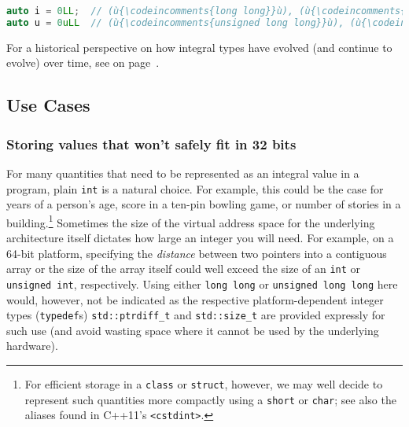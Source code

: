 \begin{lstlisting}[language=C++]
auto i = 0LL;  // (ù{\codeincomments{long long}}ù), (ù{\codeincomments{sizeof(i) * CHAR\_BIT >= 64}}ù)
auto u = 0uLL  // (ù{\codeincomments{unsigned long long}}ù), (ù{\codeincomments{sizeof(u) * CHAR\_BIT >= 64}}ù)
\end{lstlisting}

\noindent For a historical perspective on how integral types have evolved (and
continue to evolve) over time, see {\it{}} on page~\pageref{historical-perspective-on-the-evolution-of-use-of-fundamental-integral-types}.

\subsection[Use Cases]{Use Cases}\label{use-cases}

\subsubsection[Storing values that won't safely fit in 32 bits]{Storing values that won't safely fit in 32 bits}\label{when-your-pedestrian-four-byte-int-might-not-cut-it}\label{Storing-values-that-won't-safely-fit-in-32-bits}

For many quantities that need to be represented as an integral value in a program, plain \lstinline!int! is a natural choice. For example, this could be the case for years of a person's age, score in a ten-pin bowling game, or number of stories in a building.{\cprotect\footnote{For efficient storage in a \lstinline!class!
or \lstinline!struct!, however, we may well decide to represent such
quantities more compactly using a \lstinline!short! or \lstinline!char!; see
  also the aliases found in C++11's \lstinline!<cstdint>!.}} Sometimes the size of the virtual address space for the
underlying architecture itself dictates how large an integer you will
need. For example, on a 64-bit platform, specifying the \emph{distance} between two pointers
into a contiguous array or the size of the array itself could well exceed the size of an \lstinline!int! or
\lstinline!unsigned!~\lstinline!int!, respectively. Using either
\lstinline!long!~\lstinline!long! or
\lstinline!unsigned!~\lstinline!long!~\lstinline!long! here would, however, not
be indicated as the respective platform-dependent integer types
(\lstinline!typedef!s) \lstinline!std::ptrdiff_t! and \lstinline!std::size_t!
are provided expressly for such use (and avoid wasting space where it
cannot be used by the underlying hardware).

